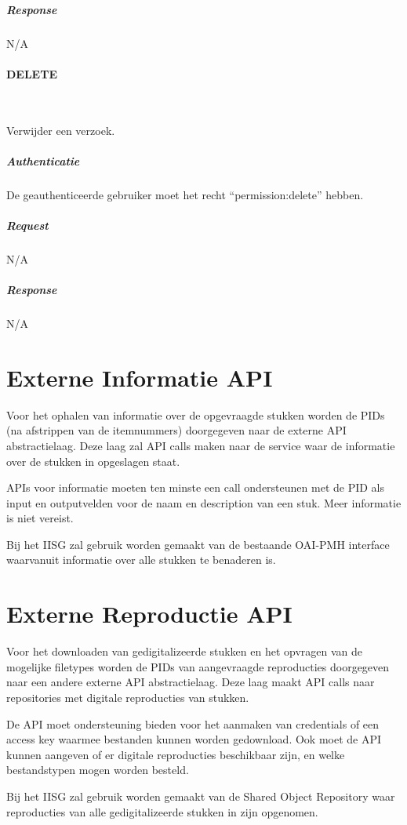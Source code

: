 \documentclass[a4paper,titlepage]{report}
\makeatletter
\def\namedlabel#1#2{
  \label{#1}
  \begingroup
   \def\@currentlabel{#2}%
   \label{#1:name}\endgroup
}
\makeatother
\begin{document}
          \subparagraph{Response} N/A

        \paragraph{DELETE}\hfill\\
          \namedlabel{api:permission:delete}{DELETE /permission/[id]}
          Verwijder een verzoek.

          \subparagraph{Authenticatie}
            De geauthenticeerde gebruiker moet het recht ``permission:delete''
            hebben.

          \subparagraph{Request} N/A

          \subparagraph{Response} N/A

  \pagebreak
  \section{Externe Informatie API}
  \label{sec:oai_api}

  Voor het ophalen van informatie over de opgevraagde stukken worden de PIDs
  (na afstrippen van de itemnummers) doorgegeven naar de externe API
  abstractielaag. Deze laag zal API calls maken naar de service waar de
  informatie over de stukken in opgeslagen staat.

  APIs voor informatie moeten ten minste een call ondersteunen met de PID als
  input en outputvelden voor de naam en description van een stuk. Meer
  informatie is niet vereist.

  Bij het IISG zal gebruik worden gemaakt van de bestaande OAI-PMH interface
  waarvanuit informatie over alle stukken te benaderen is.

  \section{Externe Reproductie API}
  \label{sec:sor_api}

  Voor het downloaden van gedigitalizeerde stukken en het opvragen van de
  mogelijke filetypes worden de PIDs van aangevraagde reproducties doorgegeven
  naar een andere externe API abstractielaag. Deze laag maakt API calls naar
  repositories met digitale reproducties van stukken.

  De API moet ondersteuning bieden voor het aanmaken van credentials of een
  access key waarmee bestanden kunnen worden gedownload. Ook moet de API
  kunnen aangeven of er digitale reproducties beschikbaar zijn, en welke
  bestandstypen mogen worden besteld.

  Bij het IISG zal gebruik worden gemaakt van de Shared Object Repository
  waar reproducties van alle gedigitalizeerde stukken in zijn opgenomen.

\printglossary[title=Verklarende Woordenlijst,toctitle=Verklarende Woordenlijst]
\end{document}
